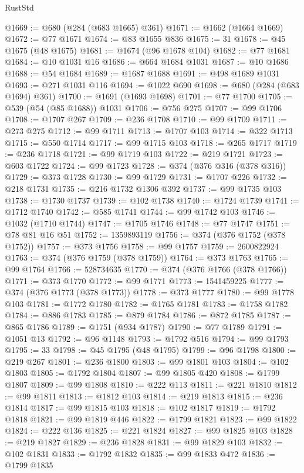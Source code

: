 \begin{lexlean}{RustStd}
\begin{coremodule}
@1669 := @680 (@284 (@683 @1665) @361)
@1671 := @1662 (@1664 @1669)
@1672 := @77 @1671
@1674 := @83 @1655 @836
@1675 := 31
@1678 := @45 @1675 (@48 @1675)
@1681 := @1674 (@96 @1678 @104)
@1682 := @77 @1681
@1684 := @10 @1031 @16
@1686 := @664 @1684 @1031
@1687 := @10 @1686
@1688 := @54 @1684
@1689 := @1687 @1688
@1691 := @498 @1689 @1031
@1693 := @271 @1031 @116
@1694 := @1022 @690
@1698 := @680 (@284 (@683 @1694) @361)
@1700 := @1691 (@1693 @1698)
@1701 := @77 @1700
@1705 := @539 (@54 (@85 @1688)) @1031
@1706 := @756 @275
@1707 := @99 @1706
@1708 := @1707 @267
@1709 := @236 @1708
@1710 := @99 @1709
@1711 := @273 @275
@1712 := @99 @1711
@1713 := @1707 @103
@1714 := @322 @1713
@1715 := @550 @1714
@1717 := @99 @1715 @103
@1718 := @265 @1717
@1719 := @236 @1718
@1721 := @99 @1719 @103
@1722 := @219 @1721
@1723 := @603 @1722
@1724 := @99 @1723
@1728 := @374 (@376 @316 (@378 @316))
@1729 := @373 @1728
@1730 := @99 @1729
@1731 := @1707 @226
@1732 := @218 @1731
@1735 := @216 @1732 @1306 @392
@1737 := @99 @1735 @103
@1738 := @1730 @1737
@1739 := @102 @1738
@1740 := @1724 @1739
@1741 := @1712 @1740
@1742 := @585 @1741
@1744 := @99 @1742 @103
@1746 := @1032 (@1710 @1744)
@1747 := @1705 @1746
@1748 := @77 @1747
@1751 := @78 @81 @16 @51
@1752 := 1359893119
@1756 := @374 (@376 @1752 (@378 @1752))
@1757 := @373 @1756
@1758 := @99 @1757
@1759 := 2600822924
@1763 := @374 (@376 @1759 (@378 @1759))
@1764 := @373 @1763
@1765 := @99 @1764
@1766 := 528734635
@1770 := @374 (@376 @1766 (@378 @1766))
@1771 := @373 @1770
@1772 := @99 @1771
@1773 := 1541459225
@1777 := @374 (@376 @1773 (@378 @1773))
@1778 := @373 @1777
@1780 := @99 @1778 @103
@1781 := @1772 @1780
@1782 := @1765 @1781
@1783 := @1758 @1782
@1784 := @886 @1783
@1785 := @879 @1784
@1786 := @872 @1785
@1787 := @865 @1786
@1789 := @1751 (@934 @1787)
@1790 := @77 @1789
@1791 := @1051 @13
@1792 := @96 @1148
@1793 := @1792 @516
@1794 := @99 @1793
@1795 := 33
@1798 := @45 @1795 (@48 @1795)
@1799 := @96 @1798
@1800 := @219 @267
@1801 := @236 @1800
@1803 := @99 @1801 @103
@1804 := @102 @1803
@1805 := @1792 @1804
@1807 := @99 @1805 @420
@1808 := @1799 @1807
@1809 := @99 @1808
@1810 := @222 @113
@1811 := @221 @1810
@1812 := @99 @1811
@1813 := @1812 @103
@1814 := @219 @1813
@1815 := @236 @1814
@1817 := @99 @1815 @103
@1818 := @102 @1817
@1819 := @1792 @1818
@1821 := @99 @1819 @446
@1822 := @1799 @1821
@1823 := @99 @1822
@1824 := @222 @136
@1825 := @221 @1824
@1827 := @99 @1825 @103
@1828 := @219 @1827
@1829 := @236 @1828
@1831 := @99 @1829 @103
@1832 := @102 @1831
@1833 := @1792 @1832
@1835 := @99 @1833 @472
@1836 := @1799 @1835

\end{coremodule}
\end{lexlean}
